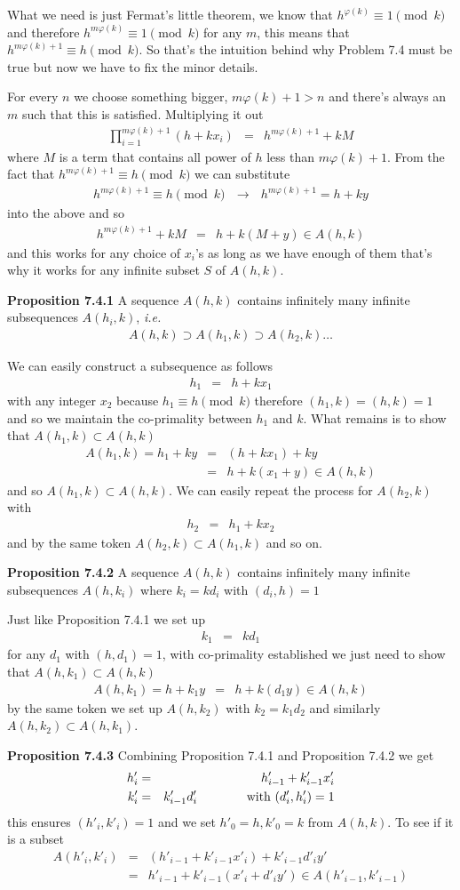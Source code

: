 \documentclass[aps,preprint,preprintnumbers,nofootinbib,showpacs,prd]{revtex4-1}
\newcommand{\ie}{{\it i.e.} }
\newcommand{\nbea}{\begin{eqnarray*}}
\newcommand{\neea}{\end{eqnarray*}}
\begin{document}
What we need is just Fermat's little theorem, we know that $h^{\varphi(k)} \equiv 1 \pmod{k}$ and therefore $h^{m\varphi(k)} \equiv 1 \pmod{k}$ for any $m$, this means that $h^{m\varphi(k) + 1} \equiv h \pmod{k}$. So that's the intuition behind why Problem 7.4 must be true but now we have to fix the minor details.

For every $n$ we choose something bigger, $m\varphi(k) + 1 > n$ and there's always an $m$ such that this is satisfied. Multiplying it out
%
\nbea
\prod_{i = 1}^{m\varphi(k) + 1} (h + kx_i) & = & h^{m\varphi(k) + 1} + kM
\neea
%
where $M$ is a term that contains all power of $h$ less than $m\varphi(k) + 1$. From the fact that $h^{m\varphi(k) + 1} \equiv h \pmod{k}$ we can substitute
%
\nbea
h^{m\varphi(k) + 1} \equiv h \pmod{k} ~~~ \to ~~~ h^{m\varphi(k) + 1} = h + ky
\neea
%
into the above and so
%
\nbea
h^{m\varphi(k) + 1} + kM & = & h + k(M+y) \in A(h,k)
\neea
%
and this works for any choice of $x_i$'s as long as we have enough of them that's why it works for any infinite subset $S$ of $A(h,k)$.

{\bf Proposition 7.4.1} A sequence $A(h,k)$ contains infinitely many infinite subsequences $A(h_i,k)$, \ie
%
\nbea
A(h,k) \supset A(h_1, k) \supset A(h_2, k) \dots
\neea
%

We can easily construct a subsequence as follows
%
\nbea
h_1 & = & h + kx_1
\neea
%
with any integer $x_2$ because $h_1 \equiv h \pmod{k}$ therefore $(h_1,k) = (h,k) = 1$ and so we maintain the co-primality between $h_1$ and $k$. What remains is to show that $A(h_1,k) \subset A(h,k)$
%
\nbea
A(h_1,k) = h_1 + ky & = & (h + kx_1) + ky \\
& = & h + k(x_1 + y) \in A(h,k)
\neea
%
and so $A(h_1,k) \subset A(h,k)$. We can easily repeat the process for $A(h_2, k)$ with
%
\nbea
h_2 & = & h_1 + kx_2
\neea
%
and by the same token $A(h_2,k) \subset A(h_1,k)$ and so on.

{\bf Proposition 7.4.2} A sequence $A(h,k)$ contains infinitely many infinite subsequences $A(h,k_i)$ where $k_i = kd_i$ with $(d_i,h) = 1$

Just like Proposition 7.4.1 we set up
%
\nbea
k_1 & = & kd_1
\neea
%
for any $d_1$ with $(h, d_1) = 1$, with co-primality established we just need to show that $A(h,k_1) \subset A(h,k)$
%
\nbea
A(h,k_1) = h + k_1 y & = & h + k(d_1y) \in A(h,k)
\neea
%
by the same token we set up $A(h,k_2)$ with $k_2 = k_1 d_2$ and similarly $A(h,k_2) \subset A(h,k_1)$.

{\bf Proposition 7.4.3} Combining Proposition 7.4.1 and Proposition 7.4.2 we get
%
\nbea
h'_i & = & h'_{i-1} + k'_{i-1}x'_{i}\\
k'_i & = & k'_{i-1}d'_i ~~~~~~~~~~~~{\rm with~} (d'_i,h'_{i}) = 1
\neea
%
this ensures $(h'_{i}, k'_i) = 1$ and we set $h'_0 = h, k'_0 = k$ from $A(h,k)$. To see if it is a subset
%
\nbea
A(h'_i, k'_i) & = & (h'_{i-1} + k'_{i-1}x'_{i}) + k'_{i-1}d'_i y' \\
& = & h'_{i-1} + k'_{i-1}(x'_i + d'_i y') \in A(h'_{i-1}, k'_{i-1})
\neea
%
\end{document}
